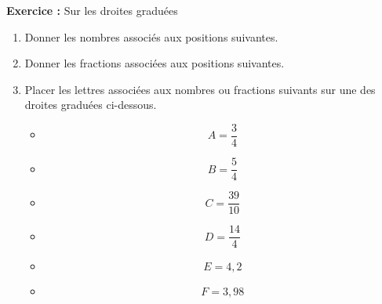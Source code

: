 \textbf{Exercice : } Sur les droites graduées

\begin{enumerate}
    \item Donner les nombres associés aux positions suivantes.
    

    \item Donner les fractions associées aux positions suivantes.



    \item Placer les lettres associées aux nombres ou fractions suivants sur une des droites graduées ci-dessous.
    \begin{multicols}{6}
        \begin{itemize}[label={}, leftmargin=*]
            \item $$A=\dfrac{3}{4}$$
            \item $$B=\dfrac{5}{4}$$
            \item $$C=\dfrac{39}{10}$$
            \item $$D=\dfrac{14}{4}$$
            \item $$E=4,2$$
            \item $$F=3,98$$
        \end{itemize}
    \end{multicols}
    \vspace{1em}



    \begin{figure}[H]
        \centering
    \end{figure}   
\end{enumerate}